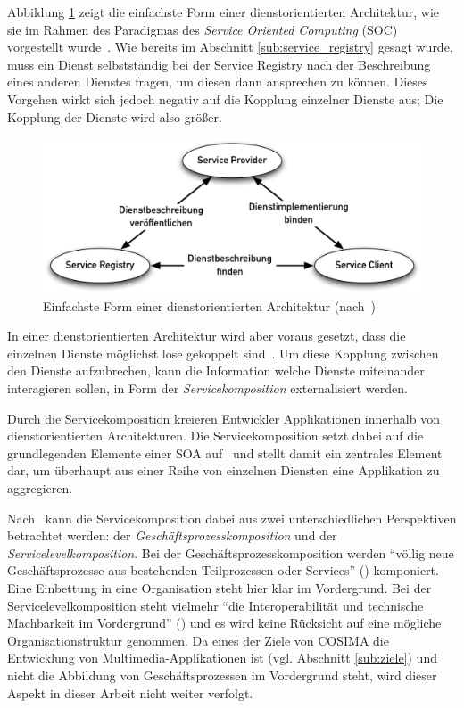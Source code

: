   Abbildung \ref{fig:images_Basic_SOA} zeigt die einfachste Form einer dienstorientierten Architektur, wie sie im Rahmen des Paradigmas des \emph{Service Oriented Computing} (SOC) vorgestellt wurde~\citep{service_oriented_computing}. Wie bereits im Abschnitt \ref{sub:service_registry} gesagt wurde, muss ein Dienst selbstständig bei der Service Registry nach der Beschreibung eines anderen Dienstes fragen, um diesen dann ansprechen zu können. Dieses Vorgehen wirkt sich jedoch negativ auf die Kopplung einzelner Dienste aus; Die Kopplung der Dienste wird also größer.
  
\begin{figure}[hb]
  \centering
    \includegraphics[width=.9\textwidth]{images/Basic_SOA.png}
  \caption{Einfachste Form einer dienstorientierten Architektur (nach~\citep{service_oriented_computing})}
  \label{fig:images_Basic_SOA}
\end{figure}

  In einer dienstorientierten Architektur wird aber voraus gesetzt, dass die einzelnen Dienste möglichst lose gekoppelt sind~\citep[S. 162]{soa_goes_real}. Um diese Kopplung zwischen den Dienste aufzubrechen, kann die Information welche Dienste miteinander interagieren sollen, in Form der \emph{Servicekomposition} externalisiert werden.

  Durch die Servicekomposition kreieren Entwickler Applikationen innerhalb von dienstorientierten Architekturen. Die Servicekomposition setzt dabei auf die grundlegenden Elemente einer SOA auf~\citep[S. 51]{milanovic2004csw} und stellt damit ein zentrales Element dar, um überhaupt aus einer Reihe von einzelnen Diensten eine Applikation zu aggregieren.
  
  Nach~\citep[S. 104]{masak2007ssb} kann die Servicekomposition dabei aus zwei unterschiedlichen Perspektiven betrachtet werden: der \emph{Geschäftsprozesskomposition} und der \emph{Servicelevelkomposition}. Bei der Geschäftsprozesskomposition werden "`völlig neue Geschäftsprozesse aus bestehenden Teilprozessen oder Services"' (\citep[S. 104]{masak2007ssb}) komponiert. Eine Einbettung in eine Organisation steht hier klar im Vordergrund. Bei der Servicelevelkomposition steht vielmehr "`die Interoperabilität und technische Machbarkeit im Vordergrund"' (\citep[S. 105]{masak2007ssb}) und es wird keine Rücksicht auf eine mögliche Organisationstruktur genommen. Da eines der Ziele von COSIMA die Entwicklung von Multimedia-Applikationen ist (vgl. Abschnitt \ref{sub:ziele}) und nicht die Abbildung von Geschäftsprozessen im Vordergrund steht, wird dieser Aspekt in dieser Arbeit nicht weiter verfolgt.
  
